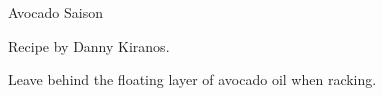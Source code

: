 \stylesection{\stylesaison}

\begin{recipe}{Avocado Saison}

\begin{aboutblock}
Recipe by Danny Kiranos.
\sourceaha
\end{aboutblock}


\begin{methodandtiming}

\begin{mashsteps}
\end{mashsteps}

\begin{fermentationsteps}
\end{fermentationsteps}

\begin{directions}
Leave behind the floating layer of avocado oil when racking.
\end{directions}

\end{methodandtiming}

\recipebreak

\begin{ingredientsblock}

\begin{malts}
\end{malts}

\begin{hops}
\end{hops}


\begin{twists}
\end{twists}

\end{ingredientsblock}

\end{recipe}

